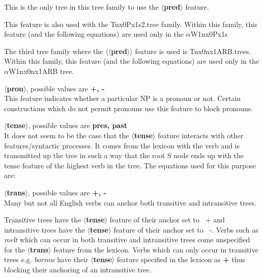 This is the only tree in this tree family to use the 
{\bf $\langle$pred$\rangle$} feature.

This feature is also used with the Tnx0Px1s2.tree family. 
 Within this family, this feature (and the
following equations) are used only in the $\alpha$W1nx0Px1s



The third tree family where the {\bf $\langle$$\langle$pred$\rangle$$\rangle$} feature is
used is Tnx0nx1ARB.trees.  Within this family, this feature (and the
following equations) are used only in the $\alpha$W1nx0nx1ARB tree.



{\bf $\langle$pron$\rangle$}, possible values are {\bf +, -}\\
This feature indicates whether a particular NP is a pronoun or not. 
Certain constructions which do not permit pronouns use this 
feature to block pronouns.

{\bf $\langle$tense$\rangle$}, possible values are {\bf pres, past}\\
It does not seem to be the case that the {\bf $\langle$tense$\rangle$}
feature interacts with other features/syntactic processes. It 
comes from the lexicon with the verb and is transmitted up the
tree in such a way that the root S node ends up with the
tense feature of the highest verb in the tree. The equations
used for this purpose are:



{\bf $\langle$trans$\rangle$}, possible values are {\bf +, -}\\
Many but not all English verbs can anchor both transitive and intransitive trees.


Transitive trees have the {\bf $\langle$tense$\rangle$} feature of their
anchor set to {\ +} and intransitive trees have the 
{\bf $\langle$tense$\rangle$} feature of their
anchor set to {\ -}. Verbs such as {\em melt} which can occur 
in both transitive and intransitive trees come unspecified for the 
{\bf $\langle$trans$\rangle$} feature from the lexicon. Verbs which 
can only occur in transitive trees e.g. {\em borrow} have their
{\bf $\langle$tense$\rangle$} feature 
specified in the lexicon as {\bf +} thus blocking their anchoring of 
an intransitive tree.


